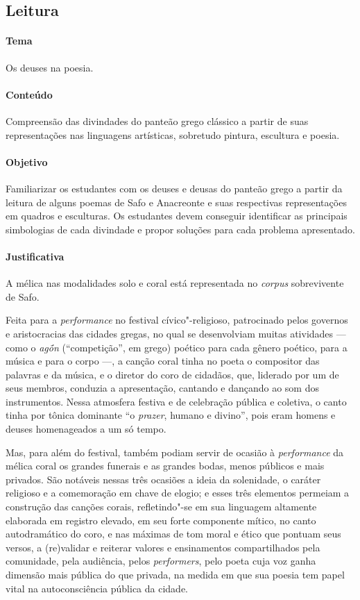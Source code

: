 \documentclass[12pt]{extarticle}
\begin{document}
\subsection{Leitura}

\paragraph{Tema} Os deuses na poesia.

\paragraph{Conteúdo} Compreensão das divindades do panteão grego clássico a partir
de suas representações nas linguagens artísticas, sobretudo pintura, escultura e poesia.

\paragraph{Objetivo} Familiarizar os estudantes com os deuses e deusas do panteão grego
a partir da leitura de alguns poemas de Safo e Anacreonte e suas respectivas representações
em quadros e esculturas. Os estudantes devem conseguir identificar as principais simbologias
de cada divindade e propor soluções para cada problema apresentado.

\paragraph{Justificativa} A mélica nas modalidades solo e coral está representada 
no \textit{corpus} sobrevivente de Safo.

Feita para a \textit{performance} no festival cívico"-religioso, patrocinado
pelos governos e aristocracias das cidades gregas, no qual se
desenvolviam muitas atividades --- como o \textit{agṓn} (``competição'', em grego) poético
para cada gênero poético, para a música e para o corpo \mbox{---,} 
a canção coral tinha no poeta o compositor das palavras e
da música, e o diretor do coro de cidadãos, que, liderado por um de seus
membros, conduzia a apresentação, cantando e dançando ao som dos instrumentos.
Nessa atmosfera festiva e de celebração pública e coletiva, o canto tinha por
tônica dominante ``o \textit{prazer}, humano e divino'', pois eram homens e deuses 
homenageados a um só tempo.

Mas, para além do festival, também podiam servir de ocasião à
\textit{performance} da mélica coral os grandes funerais e as grandes bodas,
menos públicos e mais privados. São notáveis nessas três ocasiões a ideia da
solenidade, o caráter religioso e a comemoração em chave de elogio; e esses
três elementos permeiam a construção das canções corais, refletindo"-se
em sua linguagem altamente elaborada em registro elevado, em seu forte
componente mítico, no canto autodramático do coro, e nas máximas de tom moral
e ético que pontuam seus versos, a (re)validar e reiterar valores e
ensinamentos compartilhados pela comunidade, pela audiência, pelos
\textit{performers}, pelo poeta cuja voz ganha dimensão mais
pública do que privada, na medida em que sua poesia tem papel vital na autoconsciência 
pública da cidade.
\end{document}
